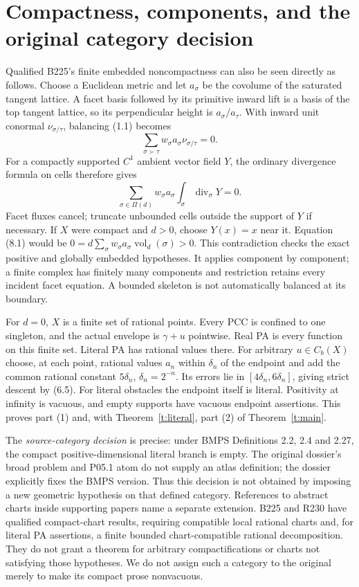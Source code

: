\documentclass[11pt]{article}
\begin{document}
\section{Compactness, components, and the original category decision}
Qualified B225's finite embedded noncompactness can also be seen directly as follows. Choose a Euclidean metric and let $a_\sigma$ be the covolume of the saturated tangent lattice. A facet basis followed by its primitive inward lift is a basis of the top tangent lattice, so its perpendicular height is $a_\sigma/a_\tau$. With inward unit conormal $\nu_{\sigma/\tau}$, balancing (1.1) becomes
\[
 \sum_{\sigma\succ\tau}w_\sigma a_\sigma\nu_{\sigma/\tau}=0.
\]
For a compactly supported $C^1$ ambient vector field $Y$, the ordinary divergence formula on cells therefore gives
\[
 \sum_{\sigma\in\Pi(d)}w_\sigma a_\sigma\int_\sigma\operatorname{div}_\sigma Y=0.
                                                                    \tag{8.1}
\]
Facet fluxes cancel; truncate unbounded cells outside the support of $Y$ if necessary. If $X$ were compact and $d>0$, choose $Y(x)=x$ near it. Equation (8.1) would be $0=d\sum_\sigma w_\sigma a_\sigma\operatorname{vol}_d(\sigma)>0$. This contradiction checks the exact positive and globally embedded hypotheses. It applies component by component; a finite complex has finitely many components and restriction retains every incident facet equation. A bounded skeleton is not automatically balanced at its boundary.

For $d=0$, $X$ is a finite set of rational points. Every PCC is confined to one singleton, and the actual envelope is $\gamma+u$ pointwise. Real PA is every function on this finite set. Literal PA has rational values there. For arbitrary $u\in C_b(X)$ choose, at each point, rational values $a_n$ within $\delta_n$ of the endpoint and add the common rational constant $5\delta_n$, $\delta_n=2^{-n}$. Its errors lie in $[4\delta_n,6\delta_n]$, giving strict descent by (6.5). For literal obstacles the endpoint itself is literal. Positivity at infinity is vacuous, and empty supports have vacuous endpoint assertions. This proves part (1) and, with Theorem~\ref{t:literal}, part (2) of Theorem~\ref{t:main}.

The \emph{source-category decision} is precise: under BMPS Definitions 2.2, 2.4 and 2.27, the compact positive-dimensional literal branch is empty. The original dossier's broad problem and P05.1 atom do not supply an atlas definition; the dossier explicitly fixes the BMPS version. Thus this decision is not obtained by imposing a new geometric hypothesis on that defined category. References to abstract charts inside supporting papers name a separate extension. B225 and R230 have qualified compact-chart results, requiring compatible local rational charts and, for literal PA assertions, a finite bounded chart-compatible rational decomposition. They do not grant a theorem for arbitrary compactifications or charts not satisfying those hypotheses. We do not assign such a category to the original merely to make its compact prose nonvacuous.
\end{document}
